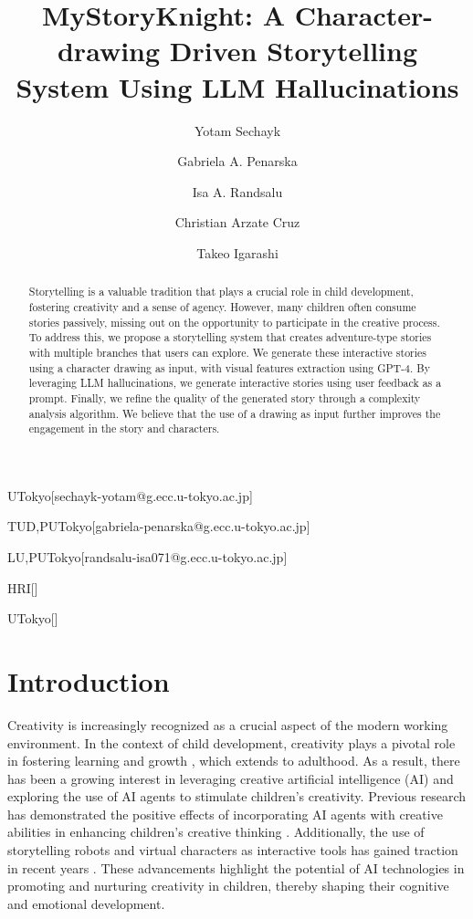 \documentclass[submit,techrep,english]{ipsj}
\begin{document}
\title{MyStoryKnight: A Character-drawing Driven Storytelling System Using LLM Hallucinations}


\author{Yotam Sechayk}{UTokyo}[sechayk-yotam@g.ecc.u-tokyo.ac.jp]
\author{Gabriela A. Penarska}{TUD,PUTokyo}[gabriela-penarska@g.ecc.u-tokyo.ac.jp]
\author{Isa A. Randsalu}{LU,PUTokyo}[randsalu-isa071@g.ecc.u-tokyo.ac.jp]
\author{Christian Arzate Cruz}{HRI}[]

\author{Takeo Igarashi}{UTokyo}[]

\begin{abstract}
    Storytelling is a valuable tradition that plays a crucial role in child development, fostering creativity and a sense of agency. However, many children often consume stories passively, missing out on the opportunity to participate in the creative process. To address this, we propose a storytelling system that creates adventure-type stories with multiple branches that users can explore. We generate these interactive stories using a character drawing as input, with visual features extraction using GPT-4. By leveraging LLM hallucinations, we generate interactive stories using user feedback as a prompt. Finally, we refine the quality of the generated story through a complexity analysis algorithm. We believe that the use of a drawing as input further improves the engagement in the story and characters.
\end{abstract}

\maketitle

\section{Introduction}
\label{sec:introduction}

Creativity is increasingly recognized as a crucial aspect of the modern working environment. In the context of child development, creativity plays a pivotal role in fostering learning and growth \cite{1:ElgarfP22}, which extends to adulthood. As a result, there has been a growing interest in leveraging creative artificial intelligence (AI) and exploring the use of AI agents to stimulate children's creativity. Previous research has demonstrated the positive effects of incorporating AI agents with creative abilities in enhancing children's creative thinking \cite{1:ElgarfP22}. Additionally, the use of storytelling robots and virtual characters as interactive tools has gained traction in recent years \cite{7:SunLLL17}. These advancements highlight the potential of AI technologies in promoting and nurturing creativity in children, thereby shaping their cognitive and emotional development.
\end{document}
